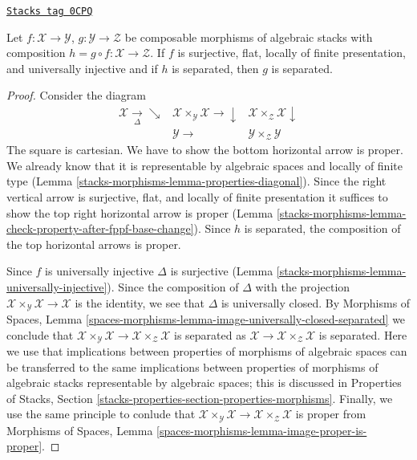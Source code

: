 \begin{lemma}
\label{stacks-morphisms-lemma-check-separated-on-ui-cover}
\href{https://stacks.math.columbia.edu/tag/0CPQ}{\texttt{Stacks tag 0CPQ}}

Let $f : \mathcal{X} \to \mathcal{Y}$, $g : \mathcal{Y} \to \mathcal{Z}$
be composable morphisms of algebraic stacks with composition
$h = g \circ f : \mathcal{X} \to \mathcal{Z}$.
If $f$ is surjective, flat, locally of finite presentation,
and universally injective and if $h$ is separated, then
$g$ is separated.
\end{lemma}

\begin{proof}
Consider the diagram
$$
\begin{array}{ccc}\mathcal{X} \underset{\Delta}{\longrightarrow}\searrow & \mathcal{X} \times_\mathcal{Y} \mathcal{X} \longrightarrow\downarrow & \mathcal{X} \times_\mathcal{Z} \mathcal{X} \downarrow \\  & \mathcal{Y} \longrightarrow & \mathcal{Y} \times_\mathcal{Z} \mathcal{Y}\end{array}
$$
The square is cartesian. We have to show the bottom horizontal arrow is proper.
We already know that it is representable by algebraic spaces and
locally of finite type (Lemma \ref{stacks-morphisms-lemma-properties-diagonal}).
Since the right vertical arrow is
surjective, flat, and locally of finite presentation
it suffices to show the top right horizontal arrow
is proper (Lemma \ref{stacks-morphisms-lemma-check-property-after-fppf-base-change}).
Since $h$ is separated, the composition of the top horizontal
arrows is proper.

\medskip\noindent
Since $f$ is universally injective $\Delta$ is surjective
(Lemma \ref{stacks-morphisms-lemma-universally-injective}). Since the
composition of $\Delta$ with the projection
$\mathcal{X} \times_\mathcal{Y} \mathcal{X} \to \mathcal{X}$
is the identity, we see that $\Delta$ is universally closed.
By Morphisms of Spaces, Lemma
\ref{spaces-morphisms-lemma-image-universally-closed-separated}
we conclude that $\mathcal{X} \times_\mathcal{Y} \mathcal{X} \to
\mathcal{X} \times_\mathcal{Z} \mathcal{X}$
is separated as $\mathcal{X} \to \mathcal{X} \times_\mathcal{Z} \mathcal{X}$
is separated. Here we use
that implications between properties of morphisms of algebraic
spaces can be transferred to the same implications between
properties of morphisms of algebraic stacks representable
by algebraic spaces; this is discussed in Properties of Stacks, Section
\ref{stacks-properties-section-properties-morphisms}.
Finally, we use the same principle to conlude that
$\mathcal{X} \times_\mathcal{Y} \mathcal{X} \to
\mathcal{X} \times_\mathcal{Z} \mathcal{X}$ is proper
from Morphisms of Spaces, Lemma
\ref{spaces-morphisms-lemma-image-proper-is-proper}.
\end{proof}

